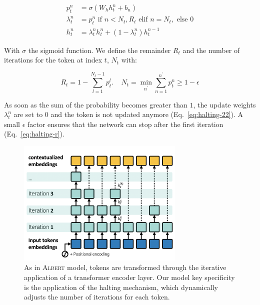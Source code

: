 \begin{align}
    p^n_t &= \sigma\left(W_hh^n_t+b_n\right) \label{eq:halting-1}\\
    \lambda^n_t &=  p^n_t \text{ if } n < N_t, R_t \text{ elif } n = N_t, \text{ else } 0 \label{eq:halting-22}\\
    h^n_t &= \lambda^n_th^n_t + (1-\lambda^n_t)h^{n-1}_t \label{eq:halting-3}
\end{align}

With $\sigma$ the sigmoid function. We define the remainder $R_t$ and the number of iterations for the token at index $t$, $N_t$ with:

\begin{equation}
R_t=1-\sum_{l=1}^{N_t-1}p^l_t. ~~~~~N_{t}=\min_{n^{\prime}}\sum_{n=1}^{n^{\prime}}p^n_t \geq 1-\epsilon \label{eq:halting-r}
\end{equation}

As soon as the sum of the probability becomes greater than $1$, the update weights $\lambda^n_t$ are set to 0 and the token is not updated anymore (Eq.~\ref{eq:halting-22}). A small $\epsilon$ factor ensures that the network can stop after the first iteration (Eq.~\ref{eq:halting-r}).

\begin{figure}[!htb]
\begin{center}
\includegraphics[width=8cm]{images/model-3.png}
\end{center}
\caption{As in \textsc{Albert}  model, tokens are transformed through the iterative application of a transformer encoder layer. Our model key specificity is the application of the halting mechanism, which dynamically adjusts the number of iterations for each token.
}
\end{figure}


